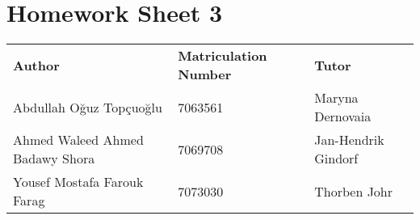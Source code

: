 \documentclass{article}
\begin{document}
\section*{\huge Homework Sheet 3}
\begin{flushright}
  \begin{tabular}{@{} l l l @{}}
    \textbf{Author} & \textbf{Matriculation Number} & \textbf{Tutor} \\
    Abdullah Oğuz Topçuoğlu         & 7063561 & Maryna Dernovaia \\
    Ahmed Waleed Ahmed Badawy Shora & 7069708 & Jan-Hendrik Gindorf \\
    Yousef Mostafa Farouk Farag     & 7073030 & Thorben Johr \\
  \end{tabular}
\end{flushright}
\end{document}
